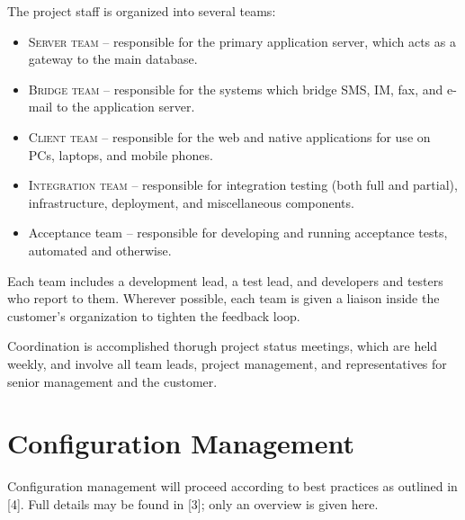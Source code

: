 \documentclass[11pt]{wacomepd}
\begin{document}
The project staff is organized into several teams:

\begin{itemize}
\item \textsc{Server team} -- responsible for the primary application server, which acts as a
  gateway to the main database.
\item \textsc{Bridge team} -- responsible for the systems which bridge SMS, IM, fax, and e-mail to
  the application server.
\item \textsc{Client team} -- responsible for the web and native applications for use on PCs,
  laptops, and mobile phones.
\item \textsc{Integration team} -- responsible for integration testing (both full and partial),
  infrastructure, deployment, and miscellaneous components.
\item {\sc Acceptance team} -- responsible for developing and running acceptance tests, automated
  and otherwise.
\end{itemize}


Each team includes a development lead, a test lead, and developers and testers who report to them.
Wherever possible, each team is given a liaison inside the customer's organization to tighten
the feedback loop.

Coordination is accomplished thorugh project status meetings, which are held weekly, and involve all
team leads, project management, and representatives for senior management and the customer.


\chapter{Configuration Management}

Configuration management will proceed according to best practices as outlined in [4].  Full details
may be found in [3]; only an overview is given here.
\end{document}
